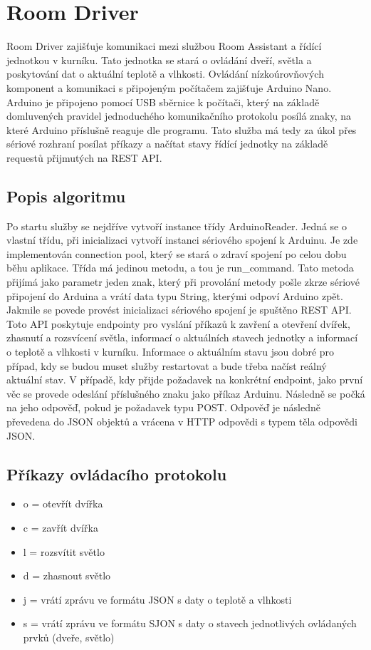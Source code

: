 \section{Room Driver}\label{sec:room-driver}
Room Driver zajišťuje komunikaci mezi službou Room Assistant a řídící jednotkou v kurníku.
Tato jednotka se stará o ovládání dveří, světla a poskytování dat o aktuální teplotě a vlhkosti.
Ovládání nízkoúrovňových komponent a komunikaci s připojeným počítačem zajišťuje Arduino Nano.
Arduino je připojeno pomocí USB sběrnice k počítači, který na základě domluvených pravidel jednoduchého komunikačního protokolu posílá znaky, na které Arduino příslušně reaguje dle programu.
Tato služba má tedy za úkol přes sériové rozhraní posílat příkazy a načítat stavy řídící jednotky na základě requestů přijmutých na REST API.

\subsection*{Popis algoritmu}
Po startu služby se nejdříve vytvoří instance třídy ArduinoReader.
Jedná se o vlastní třídu, při inicializaci vytvoří instanci sériového spojení k Arduinu.
Je zde implementován connection pool, který se stará o zdraví spojení po celou dobu běhu aplikace.
Třída má jedinou metodu, a tou je run\_command.
Tato metoda přijímá jako parametr jeden znak, který při provolání metody pošle zkrze sériové připojení do Arduina a vrátí data typu String, kterými odpoví Arduino zpět.
Jakmile se povede provést inicializaci sériového spojení je spuštěno REST API.
Toto API poskytuje endpointy pro vyslání příkazů k zavření a otevření dvířek, zhasnutí a rozsvícení světla, informací o aktuálních stavech jednotky a informací o teplotě a vlhkosti v kurníku.
Informace o aktuálním stavu jsou dobré pro případ, kdy se budou muset služby restartovat a bude třeba načíst reálný aktuální stav.
V případě, kdy přijde požadavek na konkrétní endpoint, jako první věc se provede odeslání příslušného znaku jako příkaz Arduinu.
Následně se počká na jeho odpověď, pokud je požadavek typu POST.
Odpověď je následně převedena do JSON objektů a vrácena v HTTP odpovědi s typem těla odpovědi JSON.

\subsection*{Příkazy ovládacího protokolu}
\begin{itemize}
    \item o = otevřít dvířka
    \item c = zavřít dvířka
    \item l = rozsvítit světlo
    \item d = zhasnout světlo
    \item j = vrátí zprávu ve formátu JSON s daty o teplotě a vlhkosti
    \item s = vrátí zprávu ve formátu SJON s daty o stavech jednotlivých ovládaných prvků (dveře, světlo)
\end{itemize}


